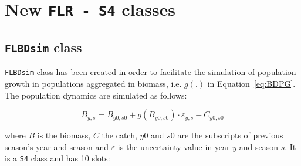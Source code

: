 
\renewcommand\thefigure{\thesection.\arabic{figure}}
\renewcommand\thetable{\thesection.\arabic{table}}

\section{New \texttt{FLR - S4} classes}

\setcounter{figure}{0} 
\setcounter{table}{0}

\subsection{\texttt{FLBDsim} class} 

	\texttt{FLBDsim} class has been created in order to facilitate the simulation of population growth
	in populations aggregated in biomass, i.e. $g(.)$ in Equation~\ref{eq:BDPG}. The population dynamics are 
	simulated as follows: 
	
			\begin{equation}
				B_{y,s} = B_{y0,s0} + g(B_{y0,s0})\cdot\varepsilon_{y,s} - C_{y0,s0}
			\end{equation}
	
	\noindent where $B$ is the biomass, $C$ the catch, $y0$ and $s0$ are the subscripts of previous season's year and season
	and $\varepsilon$ is the uncertainty value in year $y$ and season $s$.    
	It is a \texttt{S4} class and has 10 slots:
	
